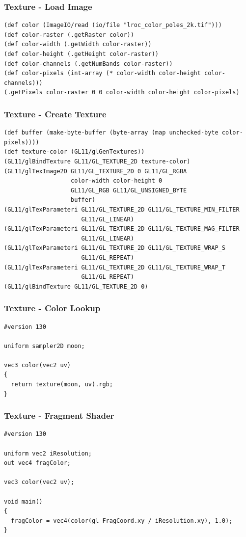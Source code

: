 \documentclass[aspectratio=169,11pt,xcolor=dvipsnames]{beamer}
\begin{document}
\begin{frame}[fragile]
  \frametitle{Texture {-} Load Image}
  \begin{verbatim}
(def color (ImageIO/read (io/file "lroc_color_poles_2k.tif")))
(def color-raster (.getRaster color))
(def color-width (.getWidth color-raster))
(def color-height (.getHeight color-raster))
(def color-channels (.getNumBands color-raster))
(def color-pixels (int-array (* color-width color-height color-channels)))
(.getPixels color-raster 0 0 color-width color-height color-pixels)
  \end{verbatim}
\end{frame}

\begin{frame}[fragile]
  \frametitle{Texture {-} Create Texture}
  \begin{verbatim}
(def buffer (make-byte-buffer (byte-array (map unchecked-byte color-pixels))))
(def texture-color (GL11/glGenTextures))
(GL11/glBindTexture GL11/GL_TEXTURE_2D texture-color)
(GL11/glTexImage2D GL11/GL_TEXTURE_2D 0 GL11/GL_RGBA
                   color-width color-height 0
                   GL11/GL_RGB GL11/GL_UNSIGNED_BYTE
                   buffer)
(GL11/glTexParameteri GL11/GL_TEXTURE_2D GL11/GL_TEXTURE_MIN_FILTER
                      GL11/GL_LINEAR)
(GL11/glTexParameteri GL11/GL_TEXTURE_2D GL11/GL_TEXTURE_MAG_FILTER
                      GL11/GL_LINEAR)
(GL11/glTexParameteri GL11/GL_TEXTURE_2D GL11/GL_TEXTURE_WRAP_S
                      GL11/GL_REPEAT)
(GL11/glTexParameteri GL11/GL_TEXTURE_2D GL11/GL_TEXTURE_WRAP_T
                      GL11/GL_REPEAT)
(GL11/glBindTexture GL11/GL_TEXTURE_2D 0)
  \end{verbatim}
\end{frame}

\begin{frame}[fragile]
  \frametitle{Texture {-} Color Lookup}
  \begin{verbatim}
#version 130

uniform sampler2D moon;

vec3 color(vec2 uv)
{
  return texture(moon, uv).rgb;
}
  \end{verbatim}
\end{frame}

\begin{frame}[fragile]
  \frametitle{Texture {-} Fragment Shader}
  \begin{verbatim}
#version 130

uniform vec2 iResolution;
out vec4 fragColor;

vec3 color(vec2 uv);

void main()
{
  fragColor = vec4(color(gl_FragCoord.xy / iResolution.xy), 1.0);
}
  \end{verbatim}
\end{frame}
\end{document}

